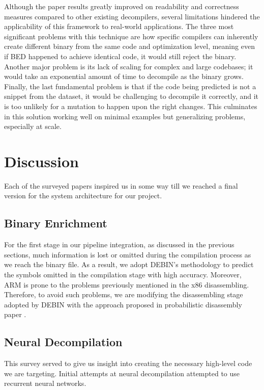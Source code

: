 \documentclass[conference,a4paper]{IEEEtran}
\begin{document}
Although the paper results greatly improved on readability and correctness measures compared to other existing decompilers, several limitations hindered the applicability of this framework to real-world applications.
The three most significant problems with this technique are how specific compilers can inherently create different binary from the same code and optimization level, meaning even if BED happened to achieve identical code, it would still reject the binary.
Another major problem is its lack of scaling for complex and large codebases; it would take an exponential amount of time to decompile as the binary grows.
Finally, the last fundamental problem is that if the code being predicted is not a snippet from the dataset, it would be challenging to decompile it correctly, and it is too unlikely for a mutation to happen upon the right changes.
This culminates in this solution working well on minimal examples but generalizing problems, especially at scale.

\section{Discussion}
Each of the surveyed papers inspired us in some way till we reached a final version for the system architecture for our project.

\subsection{Binary Enrichment}
For the first stage in our pipeline integration, as discussed in the previous sections, much information is lost or omitted during the compilation process as we reach the binary file.
As a result, we adopt DEBIN's methodology to predict the symbols omitted in the compilation stage with high accuracy.
Moreover, ARM is prone to the problems previously mentioned in the x86 disassembling.
Therefore, to avoid such problems, we are modifying the disassembling stage adopted by DEBIN with the approach proposed in probabilistic disassembly paper \cite{miller_probabilistic_2019}.

\subsection{Neural Decompilation}
This survey served to give us insight into creating the necessary high-level code we are targeting.
Initial attempts at neural decompilation attempted to use recurrent neural networks. 

\printbibliography
\end{document}
